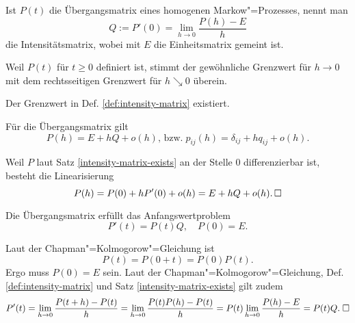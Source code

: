 \begin{Definition}[Intensitätsmatrix]\label{def:intensity-matrix}\newlinefirst
Ist $P(t)$ die Übergangsmatrix eines homogenen Markow"=Prozesses, nennt man
\[Q := P'(0) = \lim_{h\to 0}\frac{P(h)-E}{h}\]
die Intensitätsmatrix, wobei mit $E$ die Einheitsmatrix gemeint ist.
\end{Definition}
 Weil $P(t)$ für $t\ge 0$ definiert ist, stimmt der
gewöhnliche Grenzwert für $h\to 0$ mit dem rechtsseitigen Grenzwert
für $h\searrow 0$ überein.

\begin{Satz}\label{intensity-matrix-exists}
Der Grenzwert in Def. \ref{def:intensity-matrix} existiert.
\end{Satz}

\begin{Korollar}
Für die Übergangsmatrix gilt
\[P(h) = E + hQ + o(h),\,\text{bzw.}\; p_{ij}(h) = \delta_{ij} + hq_{ij} + o(h).\]
\end{Korollar}
\begin{Beweis}
Weil $P$ laut Satz \ref{intensity-matrix-exists} an der Stelle $0$
differenzierbar ist, besteht die Linearisierung
\[P(h) = P(0) + hP'(0) + o(h) = E + hQ + o(h).\,\square\]
\end{Beweis}

\begin{Satz}\newlinefirst
Die Übergangsmatrix erfüllt das Anfangswertproblem
\[P'(t)=P(t)Q,\quad P(0)=E.\]
\end{Satz}
\begin{Beweis}
Laut der Chapman"=Kolmogorow"=Gleichung ist
\[P(t) = P(0+t) = P(0)P(t).\]
Ergo muss $P(0)=E$ sein. Laut der Chapman"=Kolmogorow"=Gleichung,
Def. \ref{def:intensity-matrix} und Satz \ref{intensity-matrix-exists}
gilt zudem
\[P'(t) = \lim_{h\to 0}\frac{P(t+h)-P(t)}{h}
= \lim_{h\to 0}\frac{P(t)P(h)-P(t)}{h}
= P(t)\lim_{h\to 0}\frac{P(h)-E}{h} = P(t)Q.\;\square\]
\end{Beweis}

